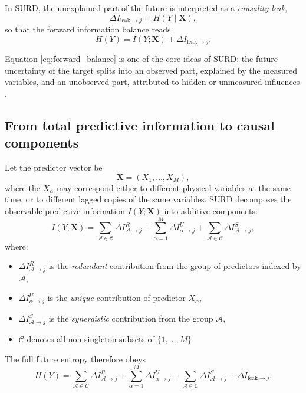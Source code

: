 \documentclass[12pt, a4paper]{article}
\begin{document}
In SURD, the unexplained part of the future is interpreted as a \emph{causality leak},
\begin{equation}
\Delta I_{\mathrm{leak}\to j}=H(Y\mid \mathbf{X}),
\label{eq:leak_def}
\end{equation}
so that the forward information balance reads
\begin{equation}
H(Y)=I(Y;\mathbf{X})+\Delta I_{\mathrm{leak}\to j}.
\label{eq:forward_balance}
\end{equation}

Equation \eqref{eq:forward_balance} is one of the core ideas of SURD: the future uncertainty of the target splits into an observed part, explained by the measured variables, and an unobserved part, attributed to hidden or unmeasured influences \cite{MartinezSanchez2024SURD}.

\subsection{From total predictive information to causal components}

Let the predictor vector be
\begin{equation}
\mathbf{X} = (X_1,\ldots,X_M),
\end{equation}
where the \(X_\alpha\) may correspond either to different physical variables at the same time, or to different lagged copies of the same variables. SURD decomposes the observable predictive information \(I(Y;\mathbf{X})\) into additive components:
\begin{equation}
I(Y;\mathbf{X})
=
\sum_{\mathcal{A}\in\mathcal{C}} \Delta I_{\mathcal{A}\to j}^{R}
+
\sum_{\alpha=1}^{M} \Delta I_{\alpha\to j}^{U}
+
\sum_{\mathcal{A}\in\mathcal{C}} \Delta I_{\mathcal{A}\to j}^{S},
\label{eq:surd_master}
\end{equation}
where:
\begin{itemize}
    \item \(\Delta I_{\mathcal{A}\to j}^{R}\) is the \emph{redundant} contribution from the group of predictors indexed by \(\mathcal{A}\),
    \item \(\Delta I_{\alpha\to j}^{U}\) is the \emph{unique} contribution of predictor \(X_\alpha\),
    \item \(\Delta I_{\mathcal{A}\to j}^{S}\) is the \emph{synergistic} contribution from the group \(\mathcal{A}\),
    \item \(\mathcal{C}\) denotes all non-singleton subsets of \(\{1,\dots,M\}\).
\end{itemize}
The full future entropy therefore obeys
\begin{equation}
H(Y)=
\sum_{\mathcal{A}\in\mathcal{C}} \Delta I_{\mathcal{A}\to j}^{R}
+
\sum_{\alpha=1}^{M} \Delta I_{\alpha\to j}^{U}
+
\sum_{\mathcal{A}\in\mathcal{C}} \Delta I_{\mathcal{A}\to j}^{S}
+
\Delta I_{\mathrm{leak}\to j}.
\label{eq:full_surd_balance}
\end{equation}
\end{document}
